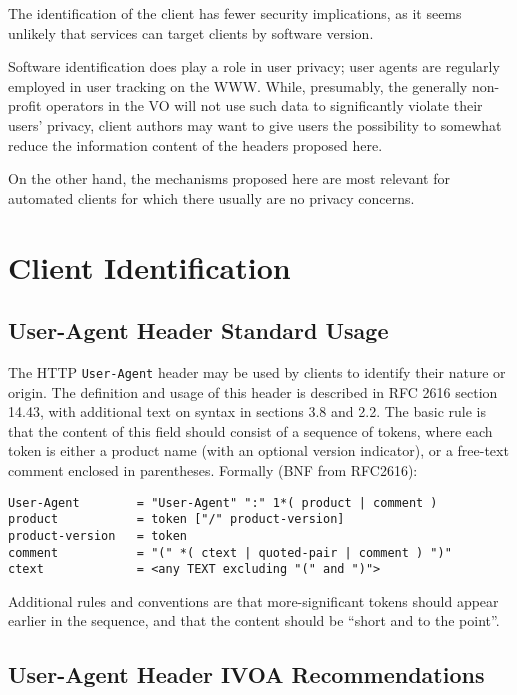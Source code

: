 \documentclass[11pt,a4paper]{ivoa}
\newcommand{\headername}[1]{{\tt #1}}
\begin{document}
The identification of the client has fewer security implications, as it
seems unlikely that services can target clients by software version.

Software identification does play a role in user privacy; user agents
are regularly employed in user tracking on the WWW.  While, presumably,
the generally non-profit operators in the VO will not use such data to
significantly violate their users' privacy, client authors may want to
give users the possibility to somewhat reduce the information content of
the headers proposed here.

On the other hand, the mechanisms proposed here are most relevant for
automated clients for which there usually are no privacy concerns.


\section{Client Identification}
\label{sect:client}

\subsection{User-Agent Header Standard Usage}

The HTTP \headername{User-Agent} header may be used by clients
to identify their
nature or origin. The definition and usage of this header is described
in RFC 2616 \citep{std:HTTP} section 14.43, with additional text on
syntax in sections 3.8 and 2.2. The basic rule is that the content of
this field should consist of a sequence of tokens, where each token is
either a product name (with an optional version indicator), or a
free-text comment enclosed in parentheses. Formally (BNF from RFC2616):

\begin{verbatim}
User-Agent        = "User-Agent" ":" 1*( product | comment )
product           = token ["/" product-version]
product-version   = token
comment           = "(" *( ctext | quoted-pair | comment ) ")"
ctext             = <any TEXT excluding "(" and ")">
\end{verbatim}

Additional rules and conventions are that more-significant tokens should
appear earlier in the sequence, and that the content should be ``short
and to the point''.

\subsection{User-Agent Header IVOA Recommendations}
\end{document}
